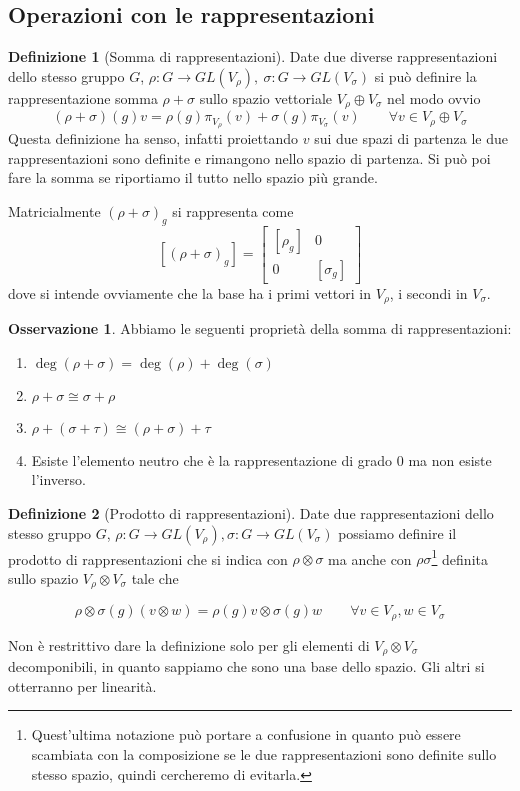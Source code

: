 \documentclass[11pt]{article}
\theoremstyle{plain}
\theoremstyle{definition}
\newtheorem{defn}{Definizione}[section]
\newtheorem*{rem}{Osservazione}
\theoremstyle{remark}
\begin{document}
\newpage
\subsection{Operazioni con le rappresentazioni}

\begin{defn}[Somma di rappresentazioni]
  Date due diverse rappresentazioni dello stesso gruppo $G$, $\rho: G \to GL(V_\rho), \ \sigma: G \to GL(V_\sigma)$ si può definire la rappresentazione somma $\rho + \sigma$ sullo spazio vettoriale $V_\rho \oplus V_\sigma$ nel modo ovvio
  \[ (\rho + \sigma)(g) v = \rho(g) \pi_{V_\rho}(v) + \sigma(g) \pi_{V_\sigma}(v) \qquad \forall v \in V_\rho \oplus V_\sigma \]
  Questa definizione ha senso, infatti proiettando $v$ sui due spazi di partenza le due rappresentazioni sono definite e rimangono nello spazio di partenza. Si può poi fare la somma se riportiamo il tutto nello spazio più grande.
\label{defn:somma di rappresentazioni}
\end{defn}
Matricialmente $(\rho+\sigma)_g$ si rappresenta come
\[ [(\rho+\sigma)_g]= \begin{bmatrix}
[\rho_g] & 0\\
0 & [\sigma_g]
\end{bmatrix} \]
dove si intende ovviamente che la base ha i primi vettori in $V_{\rho}$, i secondi in $V_{\sigma}$.\\

\begin{rem}
Abbiamo le seguenti proprietà della somma di rappresentazioni:
\begin{enumerate}
\item $\deg(\rho+\sigma)=\deg(\rho)+\deg(\sigma)$
\item $\rho + \sigma \cong \sigma + \rho$
\item $\rho + (\sigma + \tau) \cong (\rho + \sigma ) + \tau$
\item Esiste l'elemento neutro che è la rappresentazione di grado 0 ma non esiste l'inverso.
\end{enumerate}
\end{rem}




\begin{defn}[Prodotto di rappresentazioni]
  Date due rappresentazioni dello stesso gruppo $G$, $\rho: G \to GL(V_\rho), \sigma: G \to GL(V_\sigma)$ possiamo definire il prodotto di rappresentazioni che si indica con $\rho \otimes \sigma$  ma anche con $\rho\sigma$\footnote{Quest'ultima notazione può portare a confusione in quanto può essere scambiata con la composizione se le due rappresentazioni sono definite sullo stesso spazio, quindi cercheremo di evitarla.} definita sullo spazio $V_\rho \otimes V_\sigma$ tale che

  \[ \rho \otimes \sigma(g) (v \otimes w) = \rho(g) v \otimes \sigma(g) w \qquad \forall v \in V_\rho, w \in V_\sigma\]

  Non è restrittivo dare la definizione solo per gli elementi di $V_\rho \otimes V_\sigma$ decomponibili, in quanto sappiamo che sono una base dello spazio. Gli altri si otterranno per linearità.

\label{defn:prodotto di rappresentazioni}
\end{defn}
\end{document}

